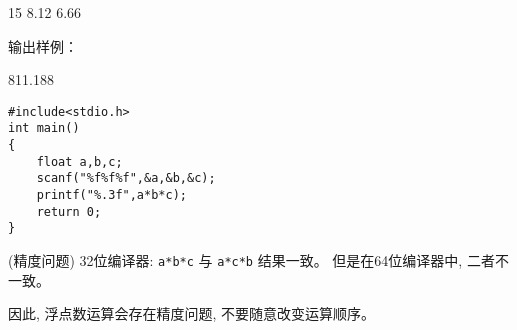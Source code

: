 15  8.12  6.66

输出样例：

811.188


\begin{lstlisting}
#include<stdio.h>   
int main()                   
{  
	float a,b,c;
	scanf("%f%f%f",&a,&b,&c);
	printf("%.3f",a*b*c); 
	return 0;           
}                  
\end{lstlisting}

\begin{note}(精度问题)
	32位编译器: \lstinline|a*b*c| 与 \lstinline|a*c*b| 结果一致。
	但是在64位编译器中, 二者不一致。
	
	因此, 浮点数运算会存在精度问题, 不要随意改变运算顺序。
\end{note}
